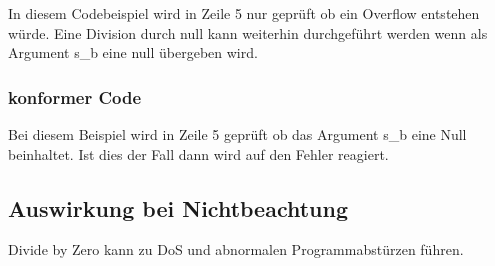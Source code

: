 \documentclass[12pt]{article}
\begin{document}
In diesem Codebeispiel wird in Zeile 5 nur geprüft ob ein Overflow entstehen würde. Eine Division durch null kann weiterhin durchgeführt werden wenn als Argument s\_b eine null übergeben wird.

\subsubsection{konformer Code}


Bei diesem Beispiel wird in Zeile 5 geprüft ob das Argument s\_b eine Null beinhaltet. Ist dies der Fall dann wird auf den Fehler reagiert.

\subsection{Auswirkung bei Nichtbeachtung}
Divide by Zero kann zu DoS und abnormalen Programmabstürzen  führen.
\end{document}
